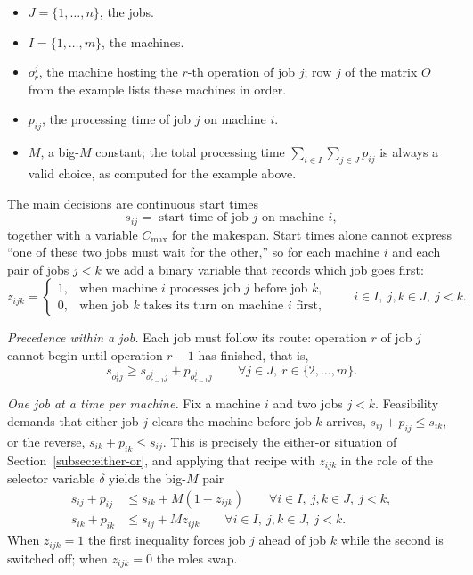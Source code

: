 \begin{itemize}
  \item $J = \{1, \ldots, n\}$, the jobs.
  \item $I = \{1, \ldots, m\}$, the machines.
\end{itemize}
\begin{itemize}
  \item $o_r^j$, the machine hosting the $r$-th operation of job $j$; row $j$ of the matrix $O$ from the example lists these machines in order.
  \item $p_{ij}$, the processing time of job $j$ on machine $i$.
  \item $M$, a big-$M$ constant; the total processing time $\sum_{i \in I} \sum_{j \in J} p_{ij}$ is always a valid choice, as computed for the example above.
\end{itemize}
The main decisions are continuous start times
$$
s_{ij} = \text{ start time of job $j$ on machine $i$},
$$
together with a variable $C_{\max}$ for the makespan.
Start times alone cannot express ``one of these two jobs must wait for the other,'' so for each machine $i$ and each pair of jobs $j < k$ we add a binary variable that records which job goes first:
$$
z_{ijk} = \begin{cases} 1, & \text{when machine } i \text{ processes job } j \text{ before job } k,\\ 0, & \text{when job } k \text{ takes its turn on machine } i \text{ first,} \end{cases}
\qquad i \in I, \ j,k \in J, \ j < k.
$$

\emph{Precedence within a job.}
Each job must follow its route: operation $r$ of job $j$ cannot begin until operation $r-1$ has finished, that is,
$$
s_{o^{j}_{r} j} \geq s_{o^{j}_{r-1} j} + p_{o^{j}_{r-1} j} \qquad \forall j \in J, \ r \in \{2, \dots, m\}.
$$

\emph{One job at a time per machine.}
Fix a machine $i$ and two jobs $j < k$.
Feasibility demands that either job $j$ clears the machine before job $k$ arrives, $s_{ij} + p_{ij} \leq s_{ik}$, or the reverse, $s_{ik} + p_{ik} \leq s_{ij}$.
This is precisely the either-or situation of Section~\ref{subsec:either-or}, and applying that recipe with $z_{ijk}$ in the role of the selector variable $\delta$ yields the big-$M$ pair
$$
\begin{aligned}
s_{ij} + p_{ij} &\leq s_{ik} + M(1 - z_{ijk}) \qquad \forall i \in I, \ j,k \in J, \ j < k,\\
s_{ik} + p_{ik} &\leq s_{ij} + M z_{ijk} \qquad \forall i \in I, \ j,k \in J, \ j < k.
\end{aligned}
$$
When $z_{ijk} = 1$ the first inequality forces job $j$ ahead of job $k$ while the second is switched off; when $z_{ijk} = 0$ the roles swap.


